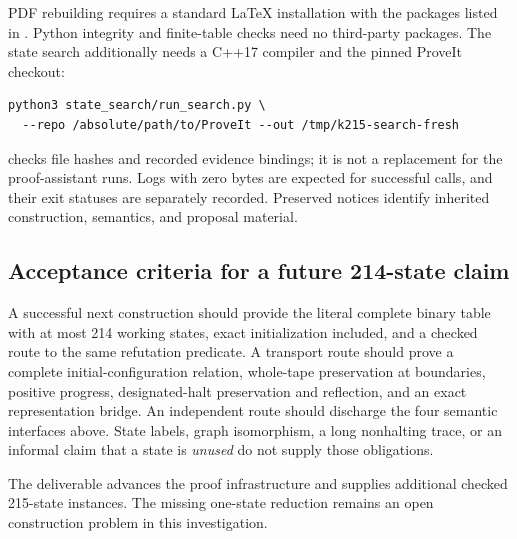 PDF rebuilding requires a standard LaTeX installation with the packages
listed in . Python integrity and finite-table checks need
no third-party packages. The state search additionally needs a C++17
compiler and the pinned ProveIt checkout:
\begin{verbatim}
python3 state_search/run_search.py \
  --repo /absolute/path/to/ProveIt --out /tmp/k215-search-fresh
\end{verbatim}

 checks file hashes and recorded evidence bindings;
it is not a replacement for the proof-assistant runs. Logs with zero bytes
are expected for successful \code{coqchk -silent} calls, and their exit
statuses are separately recorded. Preserved notices identify inherited
construction, semantics, and proposal material.

\subsection{Acceptance criteria for a future 214-state claim}

A successful next construction should provide the literal complete binary
table with at most 214 working states, exact initialization included,
and a checked route to the same refutation predicate. A transport route
should prove a complete initial-configuration relation, whole-tape
preservation at boundaries, positive progress, designated-halt
preservation and reflection, and an exact representation bridge.
An independent route should discharge the four semantic interfaces above.
State labels, graph isomorphism, a long nonhalting trace, or an informal
claim that a state is \emph{unused} do not supply those obligations.

The deliverable advances the proof infrastructure and supplies additional
checked 215-state instances. The missing one-state reduction remains an
open construction problem in this investigation.
